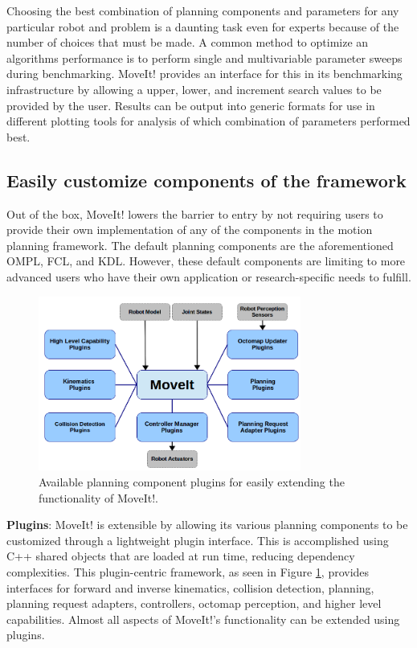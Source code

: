 \documentclass[10pt,journal,compsoc]{joser1}
\begin{document}
{Choosing the best combination of planning components and parameters for any particular robot and problem is a daunting task even for experts because of the number of choices that must be made\cite{cohen2012generic}. A common method to optimize an algorithms performance is to perform single and multivariable parameter sweeps during benchmarking. MoveIt! provides an interface for this in its benchmarking infrastructure by allowing a upper, lower, and increment search values to be provided by the user. Results can be output into generic formats for use in different plotting tools for analysis of which combination of parameters performed best.

\subsection{Easily customize components of the framework}
\label{subsec:extensiblity}

Out of the box, MoveIt! lowers the barrier to entry by not requiring users to provide their own implementation of any of the components in the motion planning framework. The default planning components are the aforementioned OMPL, FCL, and KDL. However, these default components are limiting to more advanced users who have their own application or research-specific needs to fulfill. 

\begin{figure}[!t]
\centering
\includegraphics[width=3.4in]{images/moveit_plugins}
\caption{Available planning component plugins for easily extending the functionality of MoveIt!.}
\label{fig:moveit_plugins}
\end{figure}

{\bf Plugins}: MoveIt! is extensible by allowing its various planning components to be customized through a lightweight plugin interface. This is accomplished using C++ shared objects that are loaded at run time, reducing dependency complexities. This plugin-centric framework, as seen in Figure \ref{fig:moveit_plugins}, provides interfaces for forward and inverse kinematics, collision detection, planning, planning request adapters, controllers, octomap perception, and higher level capabilities. Almost all aspects of MoveIt!'s functionality can be extended using plugins.

}
\end{document}

